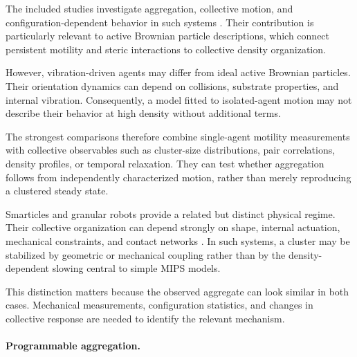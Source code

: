 The included studies investigate aggregation,
collective motion, and configuration-dependent
behavior in such systems
\cite{Fersula2026aggregatingswarmst,Standish2016roboticswarmingwit,Wang2021fielddriverobotsw,Arvin2014comparisonofdiffer,Cates2015mips,Alaviani2024visionbasedlearnin,Porvatov2021optimizingselfrota,Hao2022controllingcollisio,Mayya2019nonuniformrobotde,Zhu2025fromspikestoswarm,Welch2018aggregatesuppressio,Welch2019activereorientation,Deblais2019howtoforceanarmy,Arbel2025amechanicalroutef,Baconnier2022selectiveandcollec,Boudet2025nonmarkoviandynami,Casiulis2025ageometricconditio,Luo2025flockingphasesepar,Deblais2018boundariescontrolc,Boudet2022effectivetemperatur,Musacchio2026fluidizationinduced,Zion2023morphologicalcomput}.
Their contribution is particularly relevant
to active Brownian particle descriptions,
which connect persistent motility and
steric interactions to collective density
organization.

However, vibration-driven agents may differ
from ideal active Brownian particles.
Their orientation dynamics can depend
on collisions, substrate properties,
and internal vibration. Consequently,
a model fitted to isolated-agent motion
may not describe their behavior at
high density without additional terms.

The strongest comparisons therefore combine
single-agent motility measurements with
collective observables such as cluster-size
distributions, pair correlations,
density profiles, or temporal relaxation.
They can test whether aggregation follows
from independently characterized motion,
rather than merely reproducing a
clustered steady state.

Smarticles and granular robots provide
a related but distinct physical regime.
Their collective organization can depend
strongly on shape, internal actuation,
mechanical constraints, and contact networks
\cite{Li2018supersmarticlealo,Chvykov2020lowrattlingapred,Li2020programmingactiveg,Li2019particleroboticsba,Kaeser2025individualandcolle}.
In such systems, a cluster may be stabilized
by geometric or mechanical coupling rather
than by the density-dependent slowing
central to simple MIPS models.

This distinction matters because the
observed aggregate can look similar
in both cases. Mechanical measurements,
configuration statistics, and changes
in collective response are needed
to identify the relevant mechanism.

\paragraph*{Programmable aggregation.}

